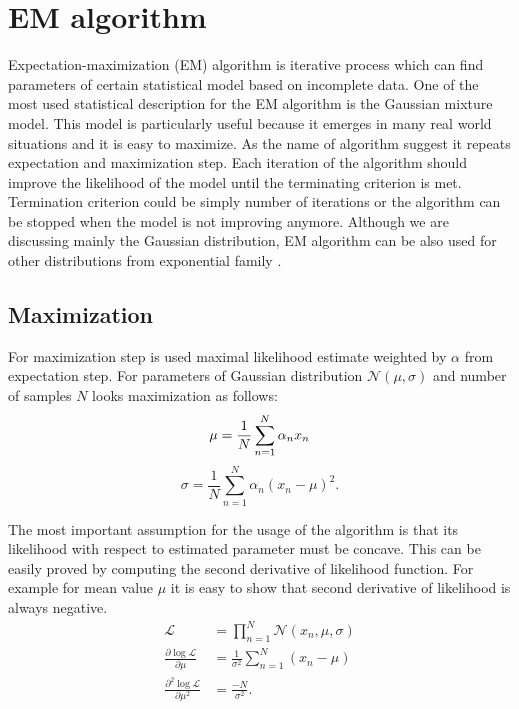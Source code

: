 \section{EM algorithm}
Expectation-maximization (EM) algorithm is iterative process which can find parameters of certain statistical model based on incomplete data. One of the most used statistical description for the EM algorithm is the Gaussian mixture model. This model is particularly useful because it emerges in many real world situations and it is easy to maximize. As the name of algorithm suggest it repeats expectation and maximization step. Each iteration of the algorithm should improve the likelihood of the model until the terminating criterion is met. Termination criterion could be simply number of iterations or the algorithm can be stopped when the model is not improving anymore. Although we are discussing mainly the Gaussian distribution, EM algorithm can be also used for other distributions from exponential family
 \cite{dempster1977}. 
 
 \subsection{Maximization}
For maximization step is used maximal likelihood estimate weighted by $\alpha$ from expectation step. For parameters of Gaussian distribution $\mathcal{N}(\mu, \sigma)$ and number of samples $N$ looks maximization as follows:
\begin{equation}
\mu = \frac{1}{N} \sum_{n = 1}^{N} \alpha_n x_n \\
\end{equation}
\begin{equation}
\sigma = \frac{1}{N} \sum_{n = 1}^{N}\alpha_n (x_n - \mu)^2.
\end{equation}

The most important assumption for the usage of the algorithm is that its likelihood with respect to estimated parameter must be concave. This can be easily proved by computing the second derivative of likelihood function. For example for mean value $\mu$ it is easy to show that second derivative of likelihood is always negative.
\begin{align}
\mathcal{L} &= \prod_{n=1}^N \mathcal{N}(x_n, \mu, \sigma) \\
\frac{\partial \log \mathcal{L}}{\partial \mu} &= \frac{1}{\sigma^2} \sum_{n = 1}^{N} (x_n - \mu) \\
\frac{\partial^2 \log \mathcal{L}}{\partial \mu^2} &= \frac{-N}{\sigma^2}.
\end{align}

